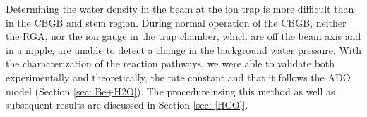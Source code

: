 Determining the water density in the beam at the ion trap is more difficult than in the CBGB and stem region. During normal operation of the CBGB, neither the RGA, nor the ion gauge in the trap chamber, which are off the beam axis and in a nipple, are unable to detect a change in the background water pressure. With the characterization of the  reaction pathways, we were able to validate both experimentally and theoretically, the rate constant and that it follows the ADO model (Section \ref{sec: Be+H2O}). The procedure using this method as well as subsequent results are discussed in Section \ref{sec: [HCO]}.